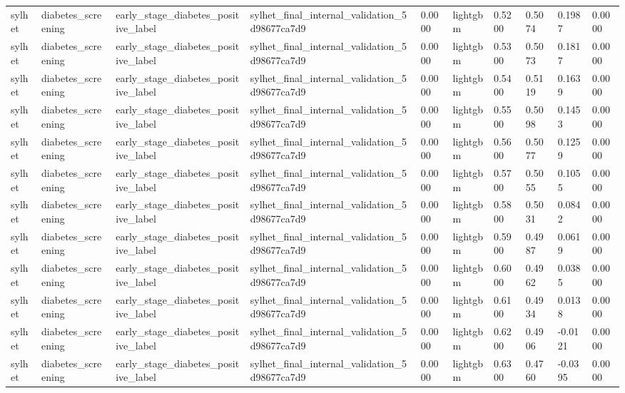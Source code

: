 \begin{tabular}{llllllllll}
sylhet & diabetes\_screening & early\_stage\_diabetes\_positive\_label & sylhet\_final\_internal\_validation\_5d98677ca7d9 & 0.0000 & lightgbm & 0.5200 & 0.5074 & 0.1987 & 0.0000 \\
sylhet & diabetes\_screening & early\_stage\_diabetes\_positive\_label & sylhet\_final\_internal\_validation\_5d98677ca7d9 & 0.0000 & lightgbm & 0.5300 & 0.5073 & 0.1817 & 0.0000 \\
sylhet & diabetes\_screening & early\_stage\_diabetes\_positive\_label & sylhet\_final\_internal\_validation\_5d98677ca7d9 & 0.0000 & lightgbm & 0.5400 & 0.5119 & 0.1639 & 0.0000 \\
sylhet & diabetes\_screening & early\_stage\_diabetes\_positive\_label & sylhet\_final\_internal\_validation\_5d98677ca7d9 & 0.0000 & lightgbm & 0.5500 & 0.5098 & 0.1453 & 0.0000 \\
sylhet & diabetes\_screening & early\_stage\_diabetes\_positive\_label & sylhet\_final\_internal\_validation\_5d98677ca7d9 & 0.0000 & lightgbm & 0.5600 & 0.5077 & 0.1259 & 0.0000 \\
sylhet & diabetes\_screening & early\_stage\_diabetes\_positive\_label & sylhet\_final\_internal\_validation\_5d98677ca7d9 & 0.0000 & lightgbm & 0.5700 & 0.5055 & 0.1055 & 0.0000 \\
sylhet & diabetes\_screening & early\_stage\_diabetes\_positive\_label & sylhet\_final\_internal\_validation\_5d98677ca7d9 & 0.0000 & lightgbm & 0.5800 & 0.5031 & 0.0842 & 0.0000 \\
sylhet & diabetes\_screening & early\_stage\_diabetes\_positive\_label & sylhet\_final\_internal\_validation\_5d98677ca7d9 & 0.0000 & lightgbm & 0.5900 & 0.4987 & 0.0619 & 0.0000 \\
sylhet & diabetes\_screening & early\_stage\_diabetes\_positive\_label & sylhet\_final\_internal\_validation\_5d98677ca7d9 & 0.0000 & lightgbm & 0.6000 & 0.4962 & 0.0385 & 0.0000 \\
sylhet & diabetes\_screening & early\_stage\_diabetes\_positive\_label & sylhet\_final\_internal\_validation\_5d98677ca7d9 & 0.0000 & lightgbm & 0.6100 & 0.4934 & 0.0138 & 0.0000 \\
sylhet & diabetes\_screening & early\_stage\_diabetes\_positive\_label & sylhet\_final\_internal\_validation\_5d98677ca7d9 & 0.0000 & lightgbm & 0.6200 & 0.4906 & -0.0121 & 0.0000 \\
sylhet & diabetes\_screening & early\_stage\_diabetes\_positive\_label & sylhet\_final\_internal\_validation\_5d98677ca7d9 & 0.0000 & lightgbm & 0.6300 & 0.4760 & -0.0395 & 0.0000 \\

\end{tabular}
